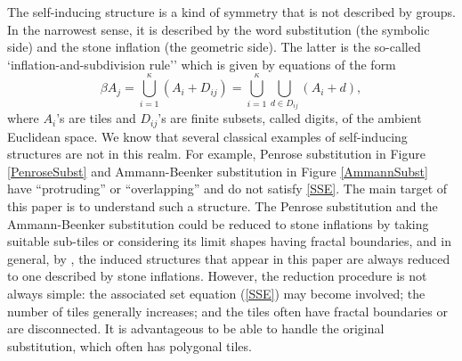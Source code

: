 \documentclass[a4]{amsart}
\theoremstyle{definition}
\begin{document}
The self-inducing structure is a kind of symmetry that is not described by groups. In the narrowest sense, it is described by the word substitution (the symbolic side) and the stone inflation (the geometric side). The latter is the so-called `inflation-and-subdivision rule'' which
is given by equations of the form
\begin{equation}
\label{SSE}
\beta A_j = \bigcup_{i=1}^{\kappa}(A_i+D_{ij})=\bigcup_{i=1}^{\kappa} \bigcup_{d\in D_{ij}} (A_i+d),
\end{equation}
where $A_i$'s are tiles and $D_{ij}$'s are finite subsets, called digits,  of the ambient Euclidean space.
We know that several classical examples of self-inducing structures are not in this realm. For example, Penrose
substitution in Figure \ref{PenroseSubst} and Ammann-Beenker
substitution in Figure \ref{AmmannSubst} have ``protruding'' or ``overlapping'' and do not
satisfy \eqref{SSE}.
The main target of this paper is to understand such a structure.
{\color{blue} The Penrose substitution and
the Ammann-Beenker substitution could be reduced
to stone inflations
by taking suitable sub-tiles }or considering its limit shapes having fractal boundaries, and in general,
by \cite{Solomyak_pseudo-self-similar},
{\color{blue}the induced structures that appear in this paper are always reduced to one described by stone inflations.
However, the reduction procedure is not always simple}: the associated set equation (\ref{SSE}) may become involved; the number of tiles generally increases; and the tiles often have fractal boundaries or are disconnected. It is advantageous to be able to handle the original substitution, which often has polygonal tiles.
\end{document}
